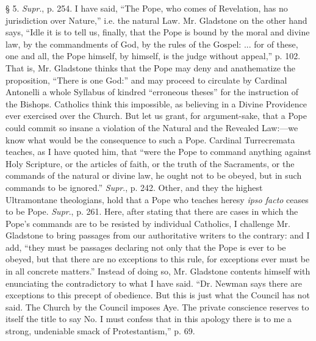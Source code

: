 § 5.
\emph{Supr}., p. 254. I have said, ``The Pope, who comes of
Revelation, has no jurisdiction over Nature,'' i.e. the natural Law.
Mr. Gladstone on the other hand says, ``Idle it is to tell us,
finally, that the Pope is bound by the moral and divine law, by the
commandments of God, by the rules of the Gospel: ... for of these, one
and all, the Pope himself, by himself, is the judge without
appeal,'' p. 102. That is, Mr. Gladstone thinks that the Pope may
deny and anathematize the proposition, ``There is one God:'' and
may proceed to circulate by Cardinal Antonelli a whole Syllabus of
kindred ``erroneous theses'' for the instruction of the Bishops.
Catholics think this impossible, as believing in a Divine Providence
ever exercised over the Church. But let us grant, for argument-sake,
that a Pope could commit so insane a violation of the Natural and the
Revealed Law:—we know what would be the consequence to such a Pope.
Cardinal Turrecremata teaches, as I have quoted him, that ``were the
Pope to command anything against Holy Scripture, or the articles
of faith, or the truth of the Sacraments, or the commands of the natural
or divine law, he ought not to be obeyed, but in such commands to be
ignored.'' \emph{Supr}., p. 242. Other, and they the highest
Ultramontane theologians, hold that a Pope who teaches heresy \emph{ipso
facto} ceases to be Pope.
\emph{Supr}., p. 261. Here, after stating that there are cases in which
the Pope's commands are to be resisted by individual Catholics, I
challenge Mr. Gladstone to bring passages from our authoritative writers
to the contrary: and I add, ``they must be passages declaring not
only that the Pope is ever to be obeyed, but that there are no
exceptions to this rule, for exceptions ever must be in all concrete
matters.'' Instead of doing so, Mr. Gladstone contents himself with
enunciating the contradictory to what I have said. ``Dr. Newman says
there are exceptions to this precept of obedience. But this is just what
the Council has not said. The Church by the Council imposes Aye. The
private conscience reserves to itself the title to say No. I must
confess that in this apology there is to me a strong, undeniable smack
of Protestantism,'' p. 69.


